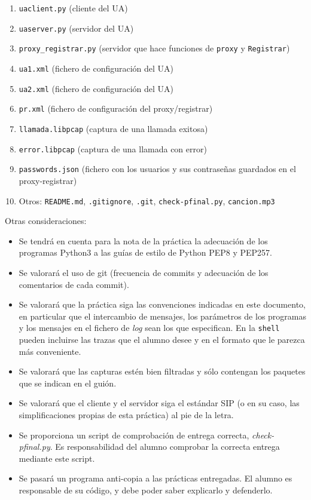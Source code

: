 \documentclass[a4paper,11pt]{article}
\begin{document}
\begin{enumerate}
  \item \texttt{uaclient.py} (cliente del UA)
  \item \texttt{uaserver.py} (servidor del UA)
  \item \texttt{proxy\_registrar.py} (servidor que hace funciones de \texttt{proxy} y \texttt{Registrar})
  \item \texttt{ua1.xml} (fichero de configuración del UA)
  \item \texttt{ua2.xml} (fichero de configuración del UA)
  \item \texttt{pr.xml} (fichero de configuración del proxy/registrar)
  \item \texttt{llamada.libpcap} (captura de una llamada exitosa)
  \item \texttt{error.libpcap} (captura de una llamada con error)
  \item \texttt{passwords.json} (fichero con los usuarios y sus contraseñas guardados en el proxy-registrar)
  \item Otros: \texttt{README.md}, \texttt{.gitignore}, \texttt{.git}, \texttt{check-pfinal.py}, \texttt{cancion.mp3}
\end{enumerate}

Otras consideraciones:
\begin{itemize}
  \item Se tendrá en cuenta para la nota de la práctica la adecuación de los
programas Python3 a las guías de estilo de Python PEP8 y PEP257.
  \item Se valorará el uso de git (frecuencia de commits y adecuación de los comentarios de cada commit).
  \item Se valorará que la práctica siga las convenciones indicadas en este documento, en particular que el intercambio de mensajes, los parámetros de los programas y los mensajes en el fichero de \emph{log} sean los que especifican. En la \texttt{shell} pueden incluirse las trazas que el alumno desee y en el formato que le parezca más conveniente.
  \item Se valorará que las capturas estén bien filtradas y sólo contengan los paquetes que se indican en el guión.
  \item Se valorará que el cliente y el servidor siga el estándar SIP (o en su caso, las simplificaciones propias de esta práctica) al pie de la letra.
  \item Se proporciona un script de comprobación de entrega correcta, \emph{check-pfinal.py}. Es responsabilidad del alumno comprobar la correcta entrega mediante este script.
  \item Se pasará un programa anti-copia a las prácticas entregadas. El alumno es responsable de su código, y debe poder saber explicarlo y defenderlo.
\end{itemize}
\end{document}
